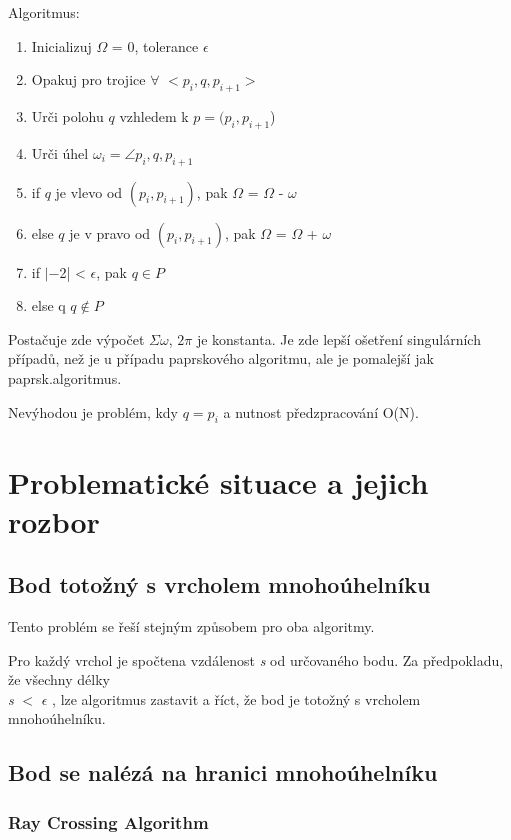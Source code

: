 \documentclass[oneside,12pt,a4paper]{book}
\begin{document}
Algoritmus$:$

\begin{enumerate}
\item Inicializuj $\Omega$ = 0, tolerance $\epsilon$
\item       Opakuj pro trojice $\forall$ $< p_i,q,p_{i+1}>$
\item \quad \quad Urči polohu $q$ vzhledem k $p = (p_i,p_{i+1}$)
\item \quad \quad Urči úhel $\omega_i= \angle p_i,q,p_{i+1}$
\item \quad \quad if $q$ je vlevo od $(p_i,p_{i+1})$, pak  $\Omega$ = $\Omega$ - $\omega$
\item \quad \quad else $q$ je v pravo od $(p_i,p_{i+1})$, pak  $\Omega$ = $\Omega$ + $\omega$
\item if  $| $\Omega$ - $2\pi$ $|  < $\epsilon$, pak $q\in P$
\item else q $q\notin P$
\end{enumerate}

\bigskip
Postačuje zde výpočet $\Sigma \omega$, $2\pi$ je konstanta. Je zde lepší ošetření singulárních případů, než je u případu paprskového algoritmu, ale je pomalejší jak paprsk.algoritmus.\par
Nevýhodou je problém, kdy $q = p_i$ a nutnost předzpracování O(N).


\chapter{Problematické situace a jejich rozbor} 

\section{Bod totožný s vrcholem mnohoúhelníku}
Tento problém se řeší stejným způsobem pro oba algoritmy.\par
Pro každý vrchol je spočtena vzdálenost \emph{s} od určovaného bodu. Za předpokladu, že
všechny délky \\ \emph{s} $<$ $\epsilon$ ,  lze algoritmus zastavit a říct, že bod je totožný s vrcholem mnohoúhelníku.

\section{Bod se nalézá na hranici mnohoúhelníku}
\subsection{Ray Crossing Algorithm}
\end{document}

